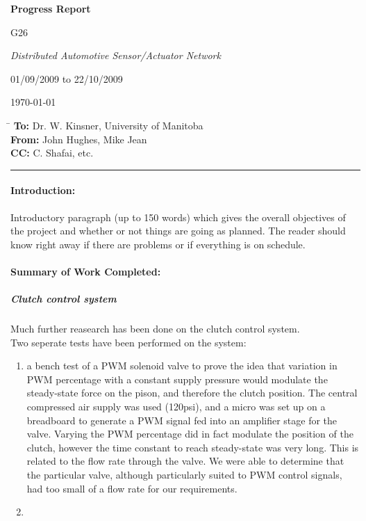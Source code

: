 \textwidth=6in
\textheight=8in
\topmargin=0.5in
\oddsidemargin=0.25in
\evensidemargin=0.25in
\headheight=0in
\footheight=0in
\headsep=0in


\centerline{\Large \bf Progress Report}
\bigskip
\bigskip

 G26
\bigskip

 {\it Distributed Automotive Sensor/Actuator Network}
\bigskip

 01/09/2009 to 22/10/2009
\bigskip

 \today

\begin{tabbing}
 \hspace{50pt}\=\kill
 {\bf To:} \> Dr. W. Kinsner, University of Manitoba \\ 
 {\bf From:} \> John Hughes, Mike Jean \\
 {\bf CC:} \> C. Shafai, etc.
\end{tabbing}

\hrule
\bigskip

\paragraph{Introduction:}
Introductory paragraph (up to 150 words) which gives the overall objectives of the project and whether or not things are going as planned. The reader should know right away if there are problems or if everything is on schedule.

\paragraph{Summary of Work Completed:}

\subparagraph{Clutch control system} Much further reasearch has been done on the clutch control system. \\
Two seperate tests have been performed on the system:
\begin{enumerate}
 \item a bench test of a PWM solenoid valve to prove the idea that variation in PWM percentage with a constant supply pressure would modulate the steady-state force on the pison, and therefore the clutch position. The central compressed air supply was used (120psi), and a micro was set up on a breadboard to generate a PWM signal fed into an amplifier stage for the valve. Varying the PWM percentage did in fact modulate the position of the clutch, however the time constant to reach steady-state was very long. This is related to the flow rate through the valve. We were able to determine that the particular valve, although particularly suited to PWM control signals, had too small of a flow rate for our requirements.
 \item 
\end{enumerate}

